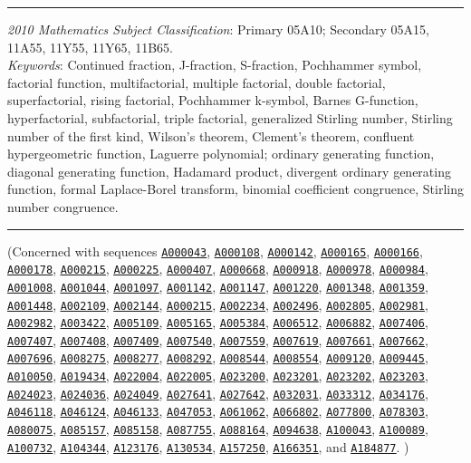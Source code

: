 \documentclass[12pt,reqno]{article}
\numberwithin{sfootnote}{section}
\numberwithin{equation}{section}
\theoremstyle{plain}
\theoremstyle{definition}
\theoremstyle{remark}
\newcommand{\seqnum}[1]{\href{http://oeis.org/#1}{\texttt{\underline{#1}}}}
\begin{document}
\bigskip\hrule\bigskip 
\noindent 
\textit{2010 Mathematics Subject Classification}: 
Primary 05A10; Secondary 05A15, 11A55, 11Y55, 11Y65, 11B65. \\ 
\textit{Keywords}: 
Continued fraction, J-fraction, S-fraction, 
Pochhammer symbol, factorial function, 
multifactorial, multiple factorial, 
double factorial, superfactorial, 
rising factorial, Pochhammer k-symbol, 
Barnes G-function, hyperfactorial, subfactorial, triple factorial, 
generalized Stirling number, Stirling number of the first kind, 
Wilson's theorem, Clement's theorem, 
confluent hypergeometric function, Laguerre polynomial; 
ordinary generating function, diagonal generating function, 
Hadamard product, divergent ordinary generating function, 
formal Laplace-Borel transform, 
binomial coefficient congruence, Stirling number congruence. 

\bigskip\hrule\bigskip 

\noindent 
(Concerned with sequences
\seqnum{A000043}, \seqnum{A000108}, \seqnum{A000142}, \seqnum{A000165}, 
\seqnum{A000166}, \seqnum{A000178}, \seqnum{A000215}, \seqnum{A000225}, 
\seqnum{A000407}, \seqnum{A000668}, \seqnum{A000918}, \seqnum{A000978},
\seqnum{A000984}, \seqnum{A001008}, \seqnum{A001044}, \seqnum{A001097}, 
\seqnum{A001142}, 
\seqnum{A001147}, \seqnum{A001220}, \seqnum{A001348}, \seqnum{A001359}, 
\seqnum{A001448}, \seqnum{A002109}, \seqnum{A002144}, \seqnum{A000215}, 
\seqnum{A002234}, \seqnum{A002496}, \seqnum{A002805}, \seqnum{A002981}, 
\seqnum{A002982}, \seqnum{A003422}, \seqnum{A005109}, \seqnum{A005165}, 
\seqnum{A005384}, \seqnum{A006512}, \seqnum{A006882}, \seqnum{A007406}, 
\seqnum{A007407}, \seqnum{A007408}, \seqnum{A007409}, \seqnum{A007540}, 
\seqnum{A007559}, \seqnum{A007619}, \seqnum{A007661}, \seqnum{A007662}, 
\seqnum{A007696}, \seqnum{A008275}, \seqnum{A008277}, \seqnum{A008292}, 
\seqnum{A008544}, \seqnum{A008554}, \seqnum{A009120}, \seqnum{A009445}, 
\seqnum{A010050}, \seqnum{A019434}, \seqnum{A022004}, \seqnum{A022005}, 
\seqnum{A023200}, \seqnum{A023201}, \seqnum{A023202}, \seqnum{A023203}, 
\seqnum{A024023}, \seqnum{A024036}, \seqnum{A024049}, \seqnum{A027641}, 
\seqnum{A027642}, \seqnum{A032031}, \seqnum{A033312}, \seqnum{A034176}, 
\seqnum{A046118}, \seqnum{A046124}, \seqnum{A046133}, \seqnum{A047053}, 
\seqnum{A061062}, \seqnum{A066802}, \seqnum{A077800}, \seqnum{A078303}, 
\seqnum{A080075}, \seqnum{A085157}, \seqnum{A085158}, \seqnum{A087755}, 
\seqnum{A088164}, \seqnum{A094638}, \seqnum{A100043}, \seqnum{A100089}, 
\seqnum{A100732}, \seqnum{A104344}, \seqnum{A123176}, \seqnum{A130534}, 
\seqnum{A157250}, \seqnum{A166351}, and \seqnum{A184877}.
) 
\end{document}

